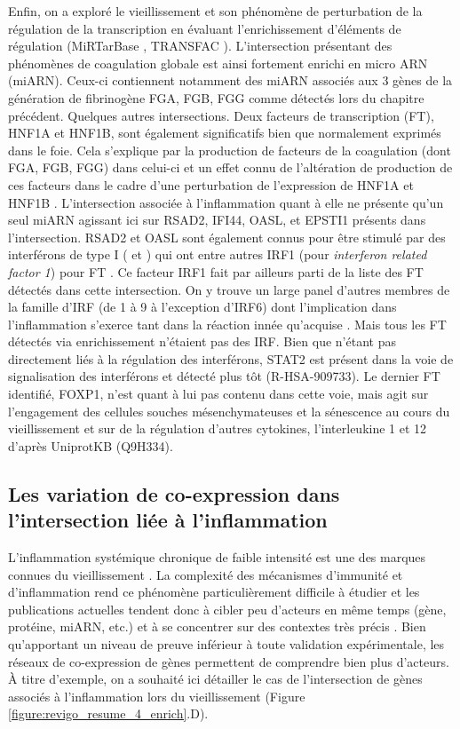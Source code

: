 Enfin, on a exploré le vieillissement et son phénomène de perturbation de la régulation de la transcription en évaluant l'enrichissement d'éléments de régulation (MiRTarBase , TRANSFAC ). L'intersection présentant des phénomènes de coagulation globale est ainsi fortement enrichi en micro ARN (miARN). Ceux-ci contiennent notamment des miARN associés aux 3 gènes de la génération de fibrinogène FGA, FGB, FGG comme détectés lors du chapitre précédent. Quelques autres intersections. Deux facteurs de transcription (FT), HNF1A et HNF1B, sont également significatifs bien que normalement exprimés dans le foie. Cela s'explique par la production de facteurs de la coagulation (dont FGA, FGB, FGG) dans celui-ci et un effet connu de l'altération de production de ces facteurs dans le cadre d'une perturbation de l'expression de HNF1A et HNF1B . L'intersection associée à l'inflammation quant à elle ne présente qu'un seul miARN agissant ici sur RSAD2, IFI44, OASL, et EPSTI1 présents dans l'intersection. RSAD2 et OASL sont également connus pour être stimulé par des interférons de type I (\textalpha{} et \textbeta{}) qui ont entre autres IRF1 (pour \textit{interferon related factor 1}) pour FT . Ce facteur IRF1 fait par ailleurs parti de la liste des FT détectés dans cette intersection. On y trouve un large panel d'autres membres de la famille d'IRF (de 1 à 9 à l'exception d'IRF6) dont l'implication dans l'inflammation s'exerce tant dans la réaction innée qu’acquise . Mais tous les FT détectés via enrichissement n'étaient pas des IRF. Bien que n'étant pas directement liés à la régulation des interférons, STAT2 est présent dans la voie de signalisation des interférons \textalpha{} et \textbeta{} détecté plus tôt (R-HSA-909733). Le dernier FT identifié, FOXP1, n'est quant à lui pas contenu dans cette voie, mais agit sur l'engagement des cellules souches mésenchymateuses et la sénescence au cours du vieillissement  et sur de la régulation d'autres cytokines, l'interleukine 1 et 12 d'après UniprotKB (Q9H334).

\subsection{Les variation de co-expression dans l'intersection liée à l'inflammation}

L'inflammation systémique chronique de faible intensité est une des marques connues du vieillissement . La complexité des mécanismes d'immunité et d'inflammation rend ce phénomène particulièrement difficile à étudier et les publications actuelles tendent donc à cibler peu d'acteurs en même temps (gène, protéine, miARN, etc.) et à se concentrer sur des contextes très précis . Bien qu'apportant un niveau de preuve inférieur à toute validation expérimentale, les réseaux de co-expression de gènes permettent de comprendre bien plus d'acteurs. À titre d'exemple, on a souhaité ici détailler le cas de l'intersection de gènes associés à l'inflammation lors du vieillissement (Figure \ref{figure:revigo_resume_4_enrich}.D).

